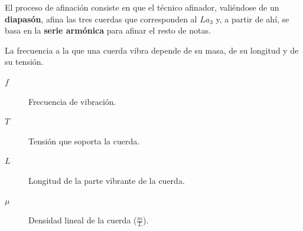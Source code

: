 \documentclass[10pt,a4paper]{article}
\begin{document}
	El proceso de afinación consiste en que el técnico afinador, valiéndose de 
	un \textbf{diapasón}, afina las tres cuerdas que corresponden al $La_3$ y, 
	a partir de ahí, se basa en la \textbf{serie armónica} para afinar el resto 
	de notas.
	
	La frecuencia a la que una cuerda vibra depende de su masa, de su longitud 
	y de su tensión.
	
	\begin{description}
		\item[$f$] Frecuencia de vibración.
		\item[$T$] Tensión que soporta la cuerda.
		\item[$L$] Longitud de la parte vibrante de la cuerda.
		\item[$\mu$] Densidad lineal de la cuerda ($\frac{m}{L}$).
	\end{description}
\end{document}
